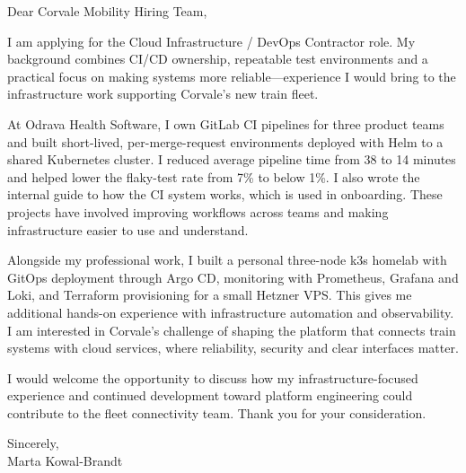 \documentclass[11pt,a4paper]{article}
\begin{document}
Dear Corvale Mobility Hiring Team,

I am applying for the Cloud Infrastructure / DevOps Contractor role. My background combines CI/CD ownership, repeatable test environments and a practical focus on making systems more reliable---experience I would bring to the infrastructure work supporting Corvale’s new train fleet.

At Odrava Health Software, I own GitLab CI pipelines for three product teams and built short-lived, per-merge-request environments deployed with Helm to a shared Kubernetes cluster. I reduced average pipeline time from 38 to 14 minutes and helped lower the flaky-test rate from 7\% to below 1\%. I also wrote the internal guide to how the CI system works, which is used in onboarding. These projects have involved improving workflows across teams and making infrastructure easier to use and understand.

Alongside my professional work, I built a personal three-node k3s homelab with GitOps deployment through Argo CD, monitoring with Prometheus, Grafana and Loki, and Terraform provisioning for a small Hetzner VPS. This gives me additional hands-on experience with infrastructure automation and observability. I am interested in Corvale’s challenge of shaping the platform that connects train systems with cloud services, where reliability, security and clear interfaces matter.

I would welcome the opportunity to discuss how my infrastructure-focused experience and continued development toward platform engineering could contribute to the fleet connectivity team. Thank you for your consideration.

Sincerely,\\
Marta Kowal-Brandt
\end{document}

